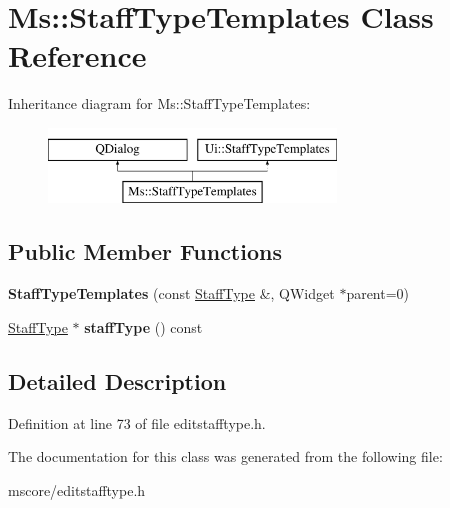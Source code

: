 \hypertarget{class_ms_1_1_staff_type_templates}{}\section{Ms\+:\+:Staff\+Type\+Templates Class Reference}
\label{class_ms_1_1_staff_type_templates}
Inheritance diagram for Ms\+:\+:Staff\+Type\+Templates\+:\begin{figure}[H]
\begin{center}
\leavevmode
\includegraphics[height=2.000000cm]{class_ms_1_1_staff_type_templates}
\end{center}
\end{figure}
\subsection*{Public Member Functions}
\begin{DoxyCompactItemize}
\item 
\mbox{\label{class_ms_1_1_staff_type_templates_a51b5709ab41a6d403009d4e91c963206}} 
{\bfseries Staff\+Type\+Templates} (const \hyperlink{class_ms_1_1_staff_type}{Staff\+Type} \&, Q\+Widget $\ast$parent=0)
\item 
\mbox{\label{class_ms_1_1_staff_type_templates_af6702ff7e0639619eeba3e18cc4dbcd7}} 
\hyperlink{class_ms_1_1_staff_type}{Staff\+Type} $\ast$ {\bfseries staff\+Type} () const
\end{DoxyCompactItemize}


\subsection{Detailed Description}


Definition at line 73 of file editstafftype.\+h.



The documentation for this class was generated from the following file\+:\begin{DoxyCompactItemize}
\item 
mscore/editstafftype.\+h\end{DoxyCompactItemize}

